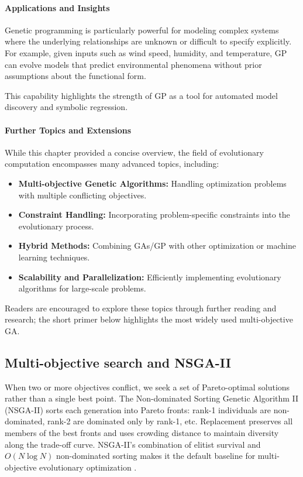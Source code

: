 \paragraph{Applications and Insights}

Genetic programming is particularly powerful for modeling complex systems where the underlying relationships are unknown or difficult to specify explicitly. For example, given inputs such as wind speed, humidity, and temperature, GP can evolve models that predict environmental phenomena without prior assumptions about the functional form.

This capability highlights the strength of GP as a tool for automated model discovery and symbolic regression.

\paragraph{Further Topics and Extensions}

While this chapter provided a concise overview, the field of evolutionary computation encompasses many advanced topics, including:

\begin{itemize}
    \item \textbf{Multi-objective Genetic Algorithms:} Handling optimization problems with multiple conflicting objectives.
    \item \textbf{Constraint Handling:} Incorporating problem-specific constraints into the evolutionary process.
    \item \textbf{Hybrid Methods:} Combining GAs/GP with other optimization or machine learning techniques.
    \item \textbf{Scalability and Parallelization:} Efficiently implementing evolutionary algorithms for large-scale problems.
\end{itemize}

Readers are encouraged to explore these topics through further reading and research; the short primer below highlights the most widely used multi-objective GA.

\subsection{Multi-objective search and NSGA-II}
\label{sec:evo_multi_objective_search_and_nsga_ii}
When two or more objectives conflict, we seek a set of Pareto-optimal solutions rather than a single best point. The Non-dominated Sorting Genetic Algorithm II (NSGA-II) sorts each generation into Pareto fronts: rank-1 individuals are non-dominated, rank-2 are dominated only by rank-1, etc. Replacement preserves all members of the best fronts and uses crowding distance to maintain diversity along the trade-off curve. NSGA-II's combination of elitist survival and \(O(N \log N)\) non-dominated sorting makes it the default baseline for multi-objective evolutionary optimization \citep{Deb2002}.
